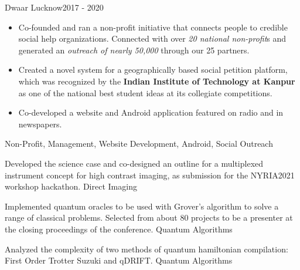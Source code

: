\begin{projects}
\project
{Dwaar Lucknow}{2017 - 2020}
{ }
{\begin{itemize}
\item Co-founded and ran a non-profit initiative that connects people to credible social help organizations. Connected with over \textit{20 national non-profit}s and generated an \textit{outreach of nearly 50,000} through our 25 partners.
\item Created a novel system for a geographically based social petition platform, which was recognized by the \textbf{Indian Institute of Technology at Kanpur} as one of the national best student ideas at its collegiate competitions.
\item Co-developed a website and Android application featured on radio and in newspapers.
\end{itemize}
}
{Non-Profit, Management, Website Development, Android, Social Outreach}

{Developed the science case and co-designed an outline for a multiplexed instrument concept for high contrast imaging, as submission for the NYRIA2021 workshop hackathon.}
{Direct Imaging}

\end{projects}
\begin{projects}

{Implemented quantum oracles to be used with Grover's algorithm to solve a range of classical problems. Selected from about 80 projects to be a presenter at the closing proceedings of the conference.}
{Quantum Algorithms}

{Analyzed the complexity of two methods of quantum hamiltonian compilation: First Order Trotter Suzuki and qDRIFT.}
{Quantum Algorithms}

\end{projects}
